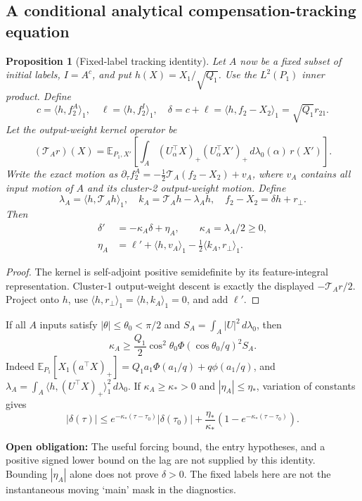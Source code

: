 \documentclass[11pt]{article}
\numberwithin{equation}{section}
\newtheorem{proposition}{Proposition}[section]
\theoremstyle{definition}
\theoremstyle{remark}
\newcommand{\E}{\mathbb E}
\newcommand{\1}{\mathbf 1}
\newcommand{\dd}{\,d}
\newcommand{\openobligation}[1]{\par\noindent\textbf{Open obligation:} #1\par\smallskip}
\begin{document}
\subsection{A conditional analytical compensation-tracking equation}
\begin{proposition}[Fixed-label tracking identity]\label{pa:tracking}
Let $A$ now be a \emph{fixed subset of initial labels}, $I=A^c$, and put
$h(X)=X_1/\sqrt{Q_1}$. Use the $L^2(P_1)$ inner product. Define
\[
 c=\langle h,f_2^A\rangle_1,\quad
 \ell=\langle h,f_2^I\rangle_1,\quad
 \delta=c+\ell=\langle h,f_2-X_2\rangle_1=\sqrt{Q_1}r_{21}.
\]
Let the output-weight kernel operator be
\[
 (\mathcal T_A r)(X)=\E_{P_1,X'}\!\left[
 \int_A(U_\alpha^\top X)_+(U_\alpha^\top X')_+\dd\lambda_0(\alpha)
 \,r(X')\right].
\]
Write the exact motion as
$\partial_\tau f_2^A=-\tfrac12\mathcal T_A(f_2-X_2)+v_A$, where $v_A$
contains all input motion of $A$ and its cluster-2 output-weight motion.
Define
\[
 \lambda_A=\langle h,\mathcal T_Ah\rangle_1,\quad
 k_A=\mathcal T_Ah-\lambda_Ah,\quad
 f_2-X_2=\delta h+r_\perp.
\]
Then
\begin{align}\label{pa:tracking-eq}
 \delta'&=-\kappa_A\delta+\eta_A,\qquad \kappa_A=\lambda_A/2\ge0,\\
 \eta_A&=\ell'+\langle h,v_A\rangle_1
 -\tfrac12\langle k_A,r_\perp\rangle_1.\nonumber
\end{align}
\end{proposition}
\begin{proof}
The kernel is self-adjoint positive semidefinite by its feature-integral
representation. Cluster-1 output-weight descent is exactly the displayed
$-\mathcal T_A r/2$. Project onto $h$, use
$\langle h,r_\perp\rangle_1=\langle h,k_A\rangle_1=0$, and add $\ell'$.
\end{proof}
If all $A$ inputs satisfy $|\theta|\le\theta_0<\pi/2$ and
$S_A=\int_A|U|^2\dd\lambda_0$, then
\begin{equation}\label{pa:trackingdamping}
 \kappa_A\ge\frac{Q_1}{2}\cos^2\theta_0
 \Phi(\cos\theta_0/q)^2S_A.
\end{equation}
Indeed
$\E_{P_1}[X_1(a^\top X)_+]=Q_1a_1\Phi(a_1/q)+q\phi(a_1/q)$,
and $\lambda_A=\int_A\langle h,(U^\top X)_+\rangle_1^2\dd\lambda_0$.
If $\kappa_A\ge\kappa_*>0$ and $|\eta_A|\le\eta_*$, variation of constants gives
\[
 |\delta(\tau)|\le e^{-\kappa_*(\tau-\tau_0)}|\delta(\tau_0)|
 +\frac{\eta_*}{\kappa_*}(1-e^{-\kappa_*(\tau-\tau_0)}).
\]
\openobligation{The useful forcing bound, the entry hypotheses, and a positive
signed lower bound on the lag are not supplied by this identity. Bounding
$|\eta_A|$ alone does not prove $\delta>0$. The fixed labels here are not the
instantaneous moving `main' mask in the diagnostics.}
\end{document}
